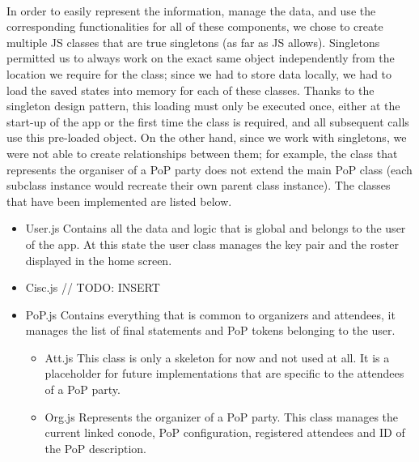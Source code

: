 \paragraph{}
In order to easily represent the information, manage the data, and use the corresponding functionalities for all of these components, we chose to create multiple JS classes that are true singletons (as far as JS allows). Singletons permitted us to always work on the exact same object independently from the location we require for the class; since we had to store data locally, we had to load the saved states into memory for each of these classes. Thanks to the singleton design pattern, this loading must only be executed once, either at the start-up of the app or the first time the class is required, and all subsequent calls use this pre-loaded object. On the other hand, since we work with singletons, we were not able to create relationships between them; for example, the class that represents the organiser of a PoP party does not extend the main PoP class (each subclass instance would recreate their own parent class instance). The classes that have been implemented are listed below.

\begin{itemize}
\item User.js \linebreak Contains all the data and logic that is global and belongs to the user of the app. At this state the user class manages the key pair and the roster displayed in the home screen.

\item Cisc.js // TODO: INSERT

\item PoP.js \linebreak Contains everything that is common to organizers and attendees, it manages the list of final statements and PoP tokens belonging to the user.
\begin{itemize}
\item Att.js \linebreak This class is only a skeleton for now and not used at all. It is a placeholder for future implementations that are specific to the attendees of a PoP party.

\item Org.js \linebreak Represents the organizer of a PoP party. This class manages the current linked conode, PoP configuration, registered attendees and ID of the PoP description.
\end{itemize}
\end{itemize}

